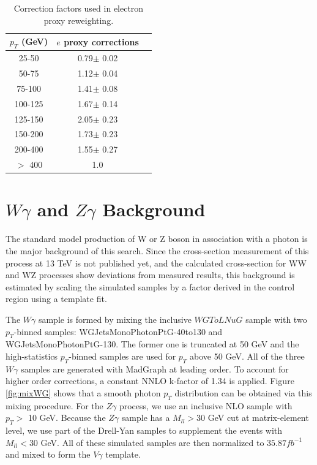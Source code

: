 \documentclass[thesis.tex]{subfiles}
\renewcommand\_{\textunderscore\allowbreak}
\begin{document}
\begin{table}[ht]
  \caption{Correction factors used in electron proxy reweighting.}
	\centering
  \begin{tabular}{|c|c|c|}
  \hline
  $p_T$ (GeV)  & $e$ proxy corrections \\ \hline
  25-50  & 0.79$\pm$ 0.02  \\ \hline
  50-75  & 1.12$\pm$ 0.04  \\ \hline
  75-100 & 1.41$\pm$ 0.08  \\ \hline 
  100-125& 1.67$\pm$ 0.14  \\ \hline 
  125-150& 2.05$\pm$ 0.23  \\ \hline 
  150-200& 1.73$\pm$ 0.23  \\ \hline
  200-400& 1.55$\pm$ 0.27  \\ \hline
  $>$ 400& 1.0 \\ \hline 
  \end{tabular}
  \label{table:correctionsfakelep}
\end{table}

\section{$W\gamma$ and $Z\gamma$ Background}\label{sec:VG}
The standard model production of W or Z boson in association with a photon is the major background of this search. Since the cross-section measurement of this process at 13 TeV is not published yet, and the calculated cross-section for WW and WZ processes show deviations from measured results, this background is estimated by scaling the simulated samples by a factor derived in the control region using a template fit. 

The $W\gamma$ sample is formed by mixing the inclusive $WGToLNuG$ sample with two $p_T$-binned samples: WGJets\_MonoPhoton\_PtG-40to130 and WGJets\_MonoPhoton\_PtG-130. The former one is truncated at 50 GeV and the high-statistics $p_T$-binned samples are used for $p_T$ above 50 GeV. All of the three $W\gamma$ samples are generated with MadGraph at leading order. To account for higher order corrections, a constant NNLO k-factor of 1.34 is applied. Figure \ref{fig:mixWG} shows that a smooth photon $p_{T}$ distribution can be obtained via this mixing procedure. For the $Z\gamma$ process, we use an inclusive NLO sample with $p_T >$ 10 GeV. Because the $Z\gamma$ sample has a $M_{ll} > 30$ GeV cut at matrix-element level, we use part of the Drell-Yan samples to supplement the events with $M_{ll} < 30$ GeV. All of these simulated samples are then normalized to $35.87 fb^{-1}$ and mixed to form the $V\gamma$ template.
\end{document}
